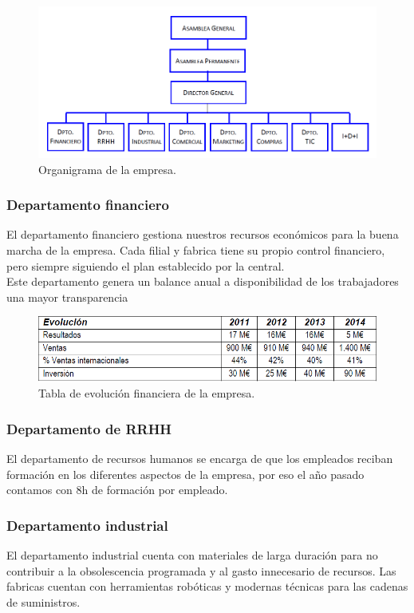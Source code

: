 \documentclass[twoside]{article}
\begin{document}
\begin{figure}[ht!]
	\includegraphics[width=130mm]{Organization.png}
	\caption{Organigrama de la empresa.}
	\label{fig:organization}
\end{figure}

\subsubsection{Departamento financiero}
El departamento financiero gestiona nuestros recursos económicos para la buena marcha de la empresa. Cada filial y fabrica tiene su propio control financiero, pero siempre siguiendo el plan establecido por la central.\\
Este departamento genera un balance anual a disponibilidad de los trabajadores una mayor transparencia 

\begin{figure}[ht!]
	\includegraphics[width=130mm]{Finances.png}
	\caption{Tabla de evolución financiera de la empresa.}
	\label{fig:finances}
\end{figure}

\subsubsection{Departamento de RRHH}
El departamento de recursos humanos se encarga de que los empleados reciban formación en los diferentes aspectos de la empresa, por eso el año pasado contamos con 8h de formación por empleado.
\subsubsection{Departamento industrial}
El departamento industrial cuenta con materiales de larga duración para no contribuir a la obsolescencia programada y al gasto innecesario de recursos. Las fabricas cuentan con herramientas robóticas y modernas técnicas para las cadenas de suministros.
\end{document}
